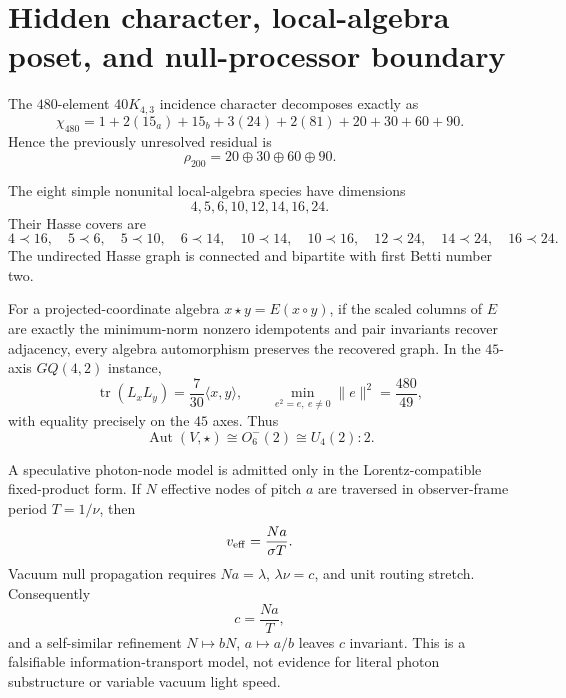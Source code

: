 \section{Hidden character, local-algebra poset, and null-processor boundary}
\label{sec:bt3937-3956}

The \(480\)-element \(40K_{4,3}\) incidence character decomposes exactly as
\[
 \chi_{480}=1+2(15_a)+15_b+3(24)+2(81)+20+30+60+90.
\]
Hence the previously unresolved residual is
\[
 \rho_{200}=20\oplus30\oplus60\oplus90.
\]

The eight simple nonunital local-algebra species have dimensions
\[
 4,5,6,10,12,14,16,24.
\]
Their Hasse covers are
\[
4\prec16,\quad 5\prec6,\quad5\prec10,\quad6\prec14,
\quad10\prec14,\quad10\prec16,
\quad12\prec24,\quad14\prec24,\quad16\prec24.
\]
The undirected Hasse graph is connected and bipartite with first Betti
number two.

For a projected-coordinate algebra \(x\star y=E(x\circ y)\), if the
scaled columns of \(E\) are exactly the minimum-norm nonzero
idempotents and pair invariants recover adjacency, every algebra
automorphism preserves the recovered graph. In the \(45\)-axis
\(GQ(4,2)\) instance,
\[
 \operatorname{tr}(L_xL_y)=\frac7{30}\langle x,y\rangle,\qquad
 \min_{e^2=e,\ e\ne0}\|e\|^2=\frac{480}{49},
\]
with equality precisely on the \(45\) axes. Thus
\[
 \operatorname{Aut}(V,\star)\cong O_6^-(2)\cong U_4(2):2.
\]

A speculative photon-node model is admitted only in the
Lorentz-compatible fixed-product form. If \(N\) effective nodes of
pitch \(a\) are traversed in observer-frame period \(T=1/\nu\), then
\[
 v_{\rm eff}=\frac{Na}{\sigma T}.
\]
Vacuum null propagation requires \(Na=\lambda\), \(\lambda\nu=c\), and
unit routing stretch. Consequently
\[
 c=\frac{Na}{T},
\]
and a self-similar refinement \(N\mapsto bN\), \(a\mapsto a/b\) leaves
\(c\) invariant. This is a falsifiable information-transport model,
not evidence for literal photon substructure or variable vacuum light
speed.
